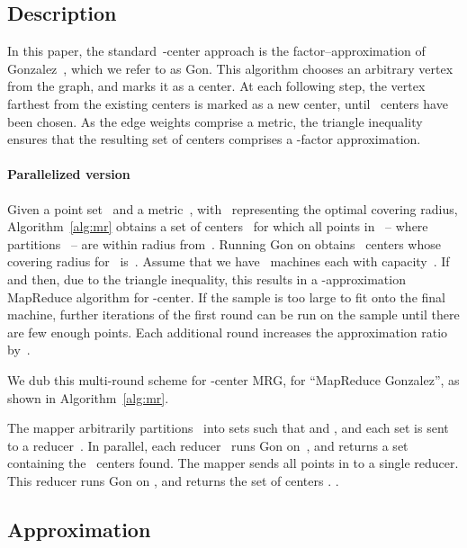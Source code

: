 \documentclass[11pt]{article}
\newcommand{\ours}{{\sc MRG}\xspace}
\newcommand{\gon}{{\sc Gon}\xspace}
\begin{document}
\subsection{Description}

In this paper, the standard~-center approach is the factor--approximation
of Gonzalez~\cite{gonzalez1985clustering}, which we refer to as \gon.
This algorithm chooses an arbitrary vertex from the graph, and marks it as a center.
At each following step, the vertex farthest from the existing centers is marked as a new center,
until~ centers have been chosen.
As the edge weights comprise a metric, the triangle inequality ensures that the resulting set of centers comprises a -factor approximation. 


\paragraph*{Parallelized version}
Given a point set~ and a metric~, with~ representing the optimal
covering radius,
Algorithm~\ref{alg:mr} obtains a set of centers~
for which all points
in~ -- where  partitions~ -- are within radius  from~. 
Running \gon on  obtains~ centers whose
covering radius for~ is~.
Assume that we have~ machines each with capacity~.
If  and  then,
due to the triangle inequality, this results in a -approximation MapReduce algorithm for -center.
If the sample is too large to fit onto the final machine, further iterations of the first round can be run on the sample until there are few enough points.
Each additional round increases the approximation ratio by~.

We dub this multi-round scheme
for -center \ours, for ``MapReduce Gonzalez'', as shown in 
Algorithm~\ref{alg:mr}.

\begin{algorithm}\begin{algorithmic}[1]
\small
\STATE 
\WHILE{ }
\STATE The mapper arbitrarily partitions~ into sets  such that  and , and each set  is sent to a reducer~. 
\STATE In parallel, each reducer~ runs \gon on~, and returns a set~ containing the ~centers found.
\STATE 
\ENDWHILE
\STATE The mapper sends all points in  to a single reducer.
\STATE This reducer runs \gon on , and returns the set of centers .
\RETURN .
\end{algorithmic}
\caption{}
\label{alg:mr}
\end{algorithm}



\subsection{Approximation}
\end{document}
